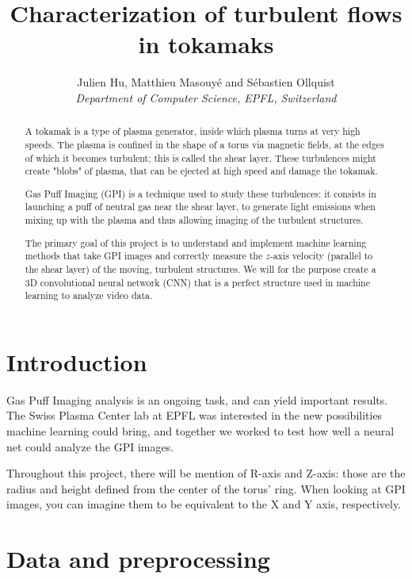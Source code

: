 \documentclass[10pt,conference]{IEEEtran}
\begin{document}
\title{Characterization of turbulent flows in tokamaks}

\author{
  Julien Hu, Matthieu Masouyé and Sébastien Ollquist\\
  \textit{Department of Computer Science, EPFL, Switzerland}
}

\maketitle

\begin{abstract}
  A tokamak is a type of plasma generator, inside which plasma turns at very high speeds. The plasma is confined in the shape of a torus via magnetic fields, at the edges of which it becomes turbulent; this is called the shear layer. These turbulences might create "blobs" of plasma, that can be ejected at high speed and damage the tokamak.\par
  Gas Puff Imaging (GPI) is a technique used to study these turbulences: it consists in launching a puff of neutral gas near the shear layer, to generate light emissions when mixing up with the plasma and thus allowing imaging of the turbulent structures.\par
  The primary goal of this project is to understand and implement machine learning methods that take GPI images and correctly measure the $z$-axis velocity (parallel to the shear layer) of the moving, turbulent structures. We will for the purpose create a 3D convolutional neural network (CNN) that is a perfect structure used in machine learning to analyze video data.
\end{abstract}

\section{Introduction}
Gas Puff Imaging analysis is an ongoing task, and can yield important results. The Swiss Plasma Center lab at EPFL was interested in the new possibilities machine learning could bring, and together we worked to test how well a neural net could analyze the GPI images.\par
Throughout this project, there will be mention of R-axis and Z-axis: those are the radius and height defined from the center of the torus' ring. When looking at GPI images, you can imagine them to be equivalent to the X and Y axis, respectively.
\section{Data and preprocessing}
\end{document}
